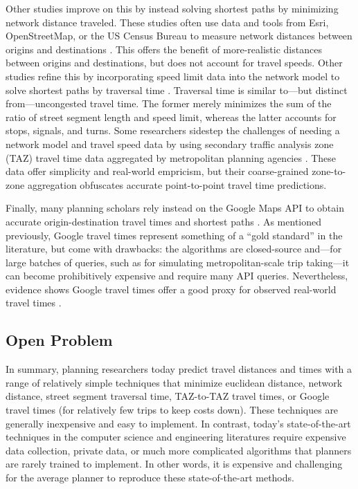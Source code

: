 \documentclass[12pt,letterpaper]{article} %
\begin{document}
Other studies improve on this by instead solving shortest paths by minimizing network distance traveled. These studies often use data and tools from Esri, OpenStreetMap, or the US Census Bureau to measure network distances between origins and destinations \citep[e.g.,][]{mckenzie2020urban, jiao2021measuring, nicoletti2023disadvantaged, logan2019evaluating, tsou2005accessibility}. This offers the benefit of more-realistic distances between origins and destinations, but does not account for travel speeds. Other studies refine this by incorporating speed limit data into the network model to solve shortest paths by traversal time \citep{kuai2017examining,williams2020parks,he2020evaluating,salonen2013modelling,scott2008role,neutens2010equity,wang2013planning}. Traversal time is similar to---but distinct from---uncongested travel time. The former merely minimizes the sum of the ratio of street segment length and speed limit, whereas the latter accounts for stops, signals, and turns. Some researchers sidestep the challenges of needing a network model and travel speed data by using secondary traffic analysis zone (TAZ) travel time data aggregated by metropolitan planning agencies \citep[e.g.,][]{grengs2010intermetropolitan,yan2021toward,levine2012does}. These data offer simplicity and real-world empricism, but their coarse-grained zone-to-zone aggregation obfuscates accurate point-to-point travel time predictions.

Finally, many planning scholars rely instead on the Google Maps API to obtain accurate origin-destination travel times and shortest paths \citep[e.g.,][]{fielbaum2021assessment,costa2021spatial, swayne2021integrating,hu2020estimating,cuervo2022dynamic,chen2020communities,hwang2024measuring}. As mentioned previously, Google travel times represent something of a \enquote{gold standard} in the literature, but come with drawbacks: the algorithms are closed-source and---for large batches of queries, such as for simulating metropolitan-scale trip taking---it can become prohibitively expensive and require many API queries. Nevertheless, evidence shows Google travel times offer a good proxy for observed real-world travel times \citep{lin2021impact,fu2023comparative,alsobky2020estimating,wang2011estimating}.

\subsection{Open Problem}

In summary, planning researchers today predict travel distances and times with a range of relatively simple techniques that minimize euclidean distance, network distance, street segment traversal time, TAZ-to-TAZ travel times, or Google travel times (for relatively few trips to keep costs down). These techniques are generally inexpensive and easy to implement. In contrast, today's state-of-the-art techniques in the computer science and engineering literatures require expensive data collection, private data, or much more complicated algorithms that planners are rarely trained to implement. In other words, it is expensive and challenging for the average planner to reproduce these state-of-the-art methods.
\end{document}
